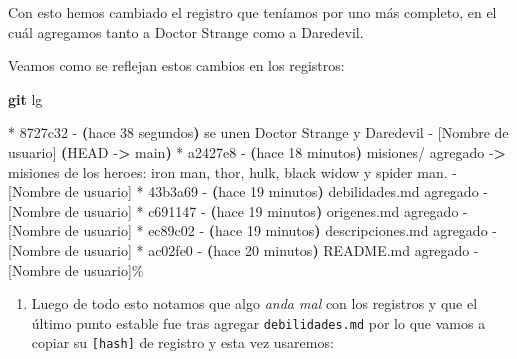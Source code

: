 \documentclass[
]{book}
\newenvironment{Shaded}{\begin{snugshade}}{\end{snugshade}}
\newcommand{\AttributeTok}[1]{\textcolor[rgb]{0.13,0.29,0.53}{#1}}
\newcommand{\ErrorTok}[1]{\textcolor[rgb]{0.64,0.00,0.00}{\textbf{#1}}}
\newcommand{\ExtensionTok}[1]{#1}
\newcommand{\FunctionTok}[1]{\textcolor[rgb]{0.13,0.29,0.53}{\textbf{#1}}}
\newcommand{\KeywordTok}[1]{\textcolor[rgb]{0.13,0.29,0.53}{\textbf{#1}}}
\newcommand{\NormalTok}[1]{#1}
\newcommand{\OperatorTok}[1]{\textcolor[rgb]{0.81,0.36,0.00}{\textbf{#1}}}
\providecommand{\tightlist}{%
  \setlength{\itemsep}{0pt}\setlength{\parskip}{0pt}}
\begin{document}
Con esto hemos cambiado el registro que teníamos por uno más completo, en el cuál agregamos tanto a Doctor Strange como a Daredevil.

Veamos como se reflejan estos cambios en los registros:

\begin{Shaded}
\begin{Highlighting}[]
\FunctionTok{git}\NormalTok{ lg}
\end{Highlighting}
\end{Shaded}

\begin{Shaded}
\begin{Highlighting}[]
\ExtensionTok{*}\NormalTok{ 8727c32 }\AttributeTok{{-}} \ErrorTok{(}\ExtensionTok{hace}\NormalTok{ 38 segundos}\KeywordTok{)} \ExtensionTok{se}\NormalTok{ unen Doctor Strange y Daredevil }\AttributeTok{{-}}\NormalTok{ [Nombre de usuario] }\ErrorTok{(}\ExtensionTok{HEAD} \AttributeTok{{-}}\OperatorTok{\textgreater{}}\NormalTok{ main}\KeywordTok{)}
\ExtensionTok{*}\NormalTok{ a2427e8 }\AttributeTok{{-}} \ErrorTok{(}\ExtensionTok{hace}\NormalTok{ 18 minutos}\KeywordTok{)} \ExtensionTok{misiones/}\NormalTok{ agregado }\AttributeTok{{-}}\OperatorTok{\textgreater{}}\NormalTok{ misiones de los heroes: iron man, thor, hulk, black widow y spider man. }\AttributeTok{{-}}\NormalTok{ [Nombre de usuario]}
\ExtensionTok{*}\NormalTok{ 43b3a69 }\AttributeTok{{-}} \ErrorTok{(}\ExtensionTok{hace}\NormalTok{ 19 minutos}\KeywordTok{)} \ExtensionTok{debilidades.md}\NormalTok{ agregado }\AttributeTok{{-}}\NormalTok{ [Nombre de usuario]}
\ExtensionTok{*}\NormalTok{ c691147 }\AttributeTok{{-}} \ErrorTok{(}\ExtensionTok{hace}\NormalTok{ 19 minutos}\KeywordTok{)} \ExtensionTok{origenes.md}\NormalTok{ agregado }\AttributeTok{{-}}\NormalTok{ [Nombre de usuario]}
\ExtensionTok{*}\NormalTok{ ec89c02 }\AttributeTok{{-}} \ErrorTok{(}\ExtensionTok{hace}\NormalTok{ 19 minutos}\KeywordTok{)} \ExtensionTok{descripciones.md}\NormalTok{ agregado }\AttributeTok{{-}}\NormalTok{ [Nombre de usuario]}
\ExtensionTok{*}\NormalTok{ ac02fe0 }\AttributeTok{{-}} \ErrorTok{(}\ExtensionTok{hace}\NormalTok{ 20 minutos}\KeywordTok{)} \ExtensionTok{README.md}\NormalTok{ agregado }\AttributeTok{{-}}\NormalTok{ [Nombre de usuario]\%       }
\end{Highlighting}
\end{Shaded}

\begin{enumerate}
\def\labelenumi{\arabic{enumi}.}
\setcounter{enumi}{2}
\tightlist
\item
  Luego de todo esto notamos que algo \emph{anda mal} con los registros y que el último punto estable fue tras agregar \texttt{debilidades.md} por lo que vamos a copiar su \texttt{{[}hash{]}} de registro y esta vez usaremos:
\end{enumerate}
\end{document}
